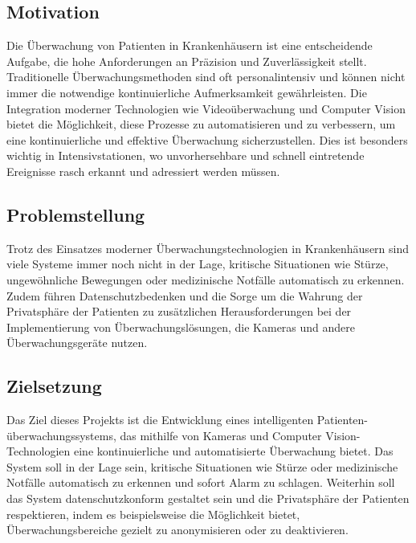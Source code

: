 \subsection{Motivation}
Die Überwachung von Patienten in Krankenhäusern ist eine entscheidende Aufgabe, die hohe Anforderungen an Präzision und Zuverlässigkeit stellt. Traditionelle Überwachungsmethoden sind oft personalintensiv und können nicht immer die notwendige kontinuierliche Aufmerksamkeit gewährleisten. Die Integration moderner Technologien wie Videoüberwachung und Computer Vision bietet die Möglichkeit, diese Prozesse zu automatisieren und zu verbessern, um eine kontinuierliche und effektive Überwachung sicherzustellen. Dies ist besonders wichtig in Intensivstationen, wo unvorhersehbare und schnell eintretende Ereignisse rasch erkannt und adressiert werden müssen.

\subsection{Problemstellung}
Trotz des Einsatzes moderner Überwachungstechnologien in Krankenhäusern sind viele Systeme immer noch nicht in der Lage, kritische Situationen wie Stürze, ungewöhnliche Bewegungen oder medizinische Notfälle automatisch zu erkennen. Zudem führen Datenschutzbedenken und die Sorge um die Wahrung der Privatsphäre der Patienten zu zusätzlichen Herausforderungen bei der Implementierung von Überwachungslösungen, die Kameras und andere Überwachungsgeräte nutzen.

\subsection{Zielsetzung}
Das Ziel dieses Projekts ist die Entwicklung eines intelligenten Patienten- überwachungssystems, das mithilfe von Kameras und Computer Vision-Technologien eine kontinuierliche und automatisierte Überwachung bietet. Das System soll in der Lage sein, kritische Situationen wie Stürze oder medizinische Notfälle automatisch zu erkennen und sofort Alarm zu schlagen. Weiterhin soll das System datenschutzkonform gestaltet sein und die Privatsphäre der Patienten respektieren, indem es beispielsweise die Möglichkeit bietet, Überwachungsbereiche gezielt zu anonymisieren oder zu deaktivieren.

